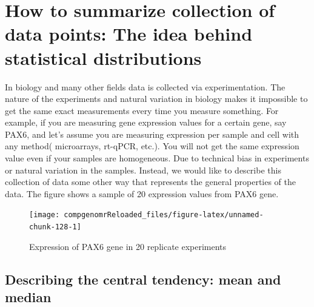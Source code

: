 \documentclass[12pt,]{krantz}
\theoremstyle{definition}
\theoremstyle{definition}
\theoremstyle{definition}
\theoremstyle{remark}
\begin{document}
\hypertarget{how-to-summarize-collection-of-data-points-the-idea-behind-statistical-distributions}{%
\section{How to summarize collection of data points: The idea behind
statistical
distributions}\label{how-to-summarize-collection-of-data-points-the-idea-behind-statistical-distributions}}

In biology and many other fields data is collected via experimentation.
The nature of the experiments and natural variation in biology makes it
impossible to get the same exact measurements every time you measure
something. For example, if you are measuring gene expression values for
a certain gene, say PAX6, and let's assume you are measuring expression
per sample and cell with any method( microarrays, rt-qPCR, etc.). You
will not get the same expression value even if your samples are
homogeneous. Due to technical bias in experiments or natural variation
in the samples. Instead, we would like to describe this collection of
data some other way that represents the general properties of the data.
The figure shows a sample of 20 expression values from PAX6 gene.

\begin{figure}

{\centering \texttt{[image: compgenomrReloaded\_files/figure-latex/unnamed-chunk-128-1]} 

}

\caption{Expression of PAX6 gene in 20 replicate experiments}\label{fig:unnamed-chunk-128}
\end{figure}

\hypertarget{describing-the-central-tendency-mean-and-median}{%
\subsection{Describing the central tendency: mean and
median}\label{describing-the-central-tendency-mean-and-median}}
\end{document}
